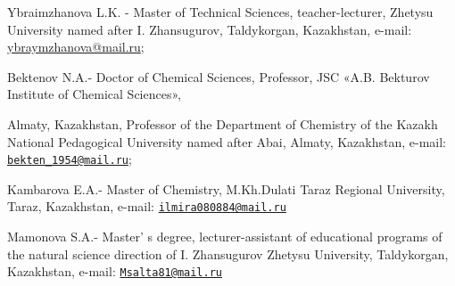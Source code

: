 Ybraimzhanova L.K. - Master of Technical Sciences, teacher-lecturer,
Zhetysu University named after I. Zhansugurov, Taldykorgan, Kazakhstan,
e-mail: \href{mailto:ybraymzhanova@mail.ruu}{ybraymzhanova@mail.ru};

Bektenov N.A.- Doctor of Chemical Sciences, Professor, JSC «A.B.
Bekturov Institute of Chemical Sciences»,

Almaty, Kazakhstan, Professor of the Department of Chemistry of the
Kazakh National Pedagogical University named after Abai, Almaty,
Kazakhstan, e-mail:
\href{mailto:bekten_1954@mail.ru}{\nolinkurl{bekten\_1954@mail.ru}};

Kambarova E.A.- Master of Chemistry, M.Kh.Dulati Taraz Regional
University, Taraz, Kazakhstan, e-mail:
\href{mailto:ilmira080884@mail.ru}{\nolinkurl{ilmira080884@mail.ru}}

Mamonova S.A.- Master' s degree, lecturer-assistant of
educational programs of the natural science direction of I. Zhansugurov
Zhetysu University, Taldykorgan, Kazakhstan, e-mail:
\href{mailto:Msalta81@mail.ru}{\nolinkurl{Msalta81@mail.ru}}
